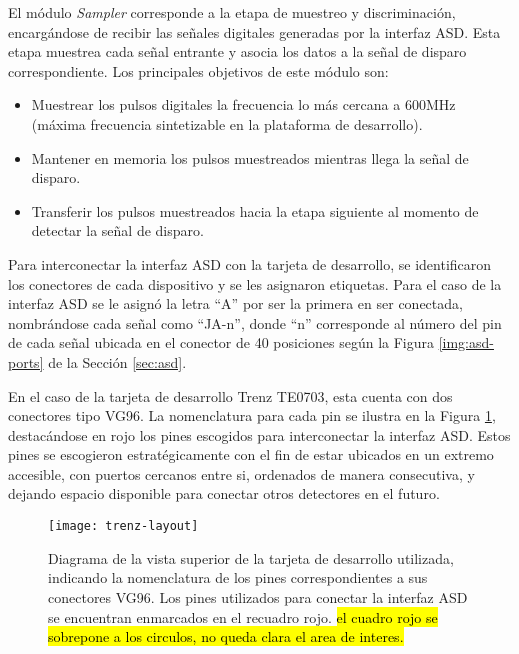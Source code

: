	El módulo \textit{Sampler} corresponde a la etapa de muestreo y discriminación, encargándose de recibir las señales digitales generadas por la interfaz ASD. Esta etapa muestrea cada señal entrante y asocia los datos a la señal de disparo correspondiente. Los principales objetivos de este módulo son:
	
	\begin{itemize}
		\item Muestrear los pulsos digitales la frecuencia lo más cercana a 600MHz (máxima frecuencia sintetizable en la plataforma de desarrollo).
		\item Mantener en memoria los pulsos muestreados mientras llega la señal de disparo.
		\item Transferir los pulsos muestreados hacia la etapa siguiente al momento de detectar la señal de disparo.
	\end{itemize}

	Para interconectar la interfaz ASD con la tarjeta de desarrollo, se identificaron los conectores de cada dispositivo y se les asignaron etiquetas. Para el caso de la interfaz ASD se le asignó la letra ``A'' por ser la primera en ser conectada, nombrándose cada señal como ``JA-n'', donde ``n'' corresponde al número del pin de cada señal ubicada en el conector de 40 posiciones según la Figura \ref{img:asd-ports} de la Sección \ref{sec:asd}.
	
	En el caso de la tarjeta de desarrollo Trenz TE0703, esta cuenta con dos conectores tipo VG96. La nomenclatura para cada pin se ilustra en la Figura \ref{fig:trenz-layout}, destacándose en rojo los pines escogidos para interconectar la interfaz ASD. Estos pines se escogieron estratégicamente con el fin de estar ubicados en un extremo accesible, con puertos cercanos entre si, ordenados de manera consecutiva, y dejando espacio disponible para conectar otros detectores en el futuro.
	
	\begin{figure}[H]
		\centering
		\texttt{[image: trenz-layout]}
		\caption{Diagrama de la vista superior de la tarjeta de desarrollo utilizada, indicando la nomenclatura de los pines correspondientes a sus conectores VG96. Los pines utilizados para conectar la interfaz ASD se encuentran enmarcados en el recuadro rojo. \hl{el cuadro rojo se sobrepone a los circulos, no queda clara el area de interes.}}
		\label{fig:trenz-layout}
	\end{figure}
	
